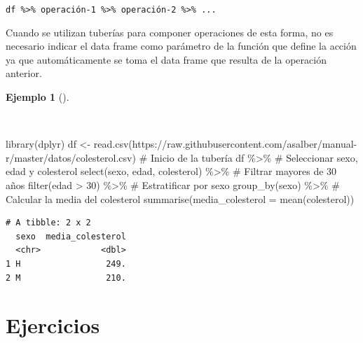 \documentclass[
  spanish,
  a4paper,
]{scrreport}
\newenvironment{Shaded}{\begin{snugshade}}{\end{snugshade}}
\newcommand{\AttributeTok}[1]{\textcolor[rgb]{0.40,0.45,0.13}{#1}}
\newcommand{\CommentTok}[1]{\textcolor[rgb]{0.37,0.37,0.37}{#1}}
\newcommand{\DecValTok}[1]{\textcolor[rgb]{0.68,0.00,0.00}{#1}}
\newcommand{\FunctionTok}[1]{\textcolor[rgb]{0.28,0.35,0.67}{#1}}
\newcommand{\NormalTok}[1]{\textcolor[rgb]{0.00,0.23,0.31}{#1}}
\newcommand{\OtherTok}[1]{\textcolor[rgb]{0.00,0.23,0.31}{#1}}
\newcommand{\SpecialCharTok}[1]{\textcolor[rgb]{0.37,0.37,0.37}{#1}}
\newcommand{\StringTok}[1]{\textcolor[rgb]{0.13,0.47,0.30}{#1}}
\theoremstyle{definition}
\theoremstyle{definition}
\newtheorem{example}{Ejemplo}[chapter]
\theoremstyle{remark}
\begin{document}
\texttt{df\ \%\textgreater{}\%\ operación-1\ \%\textgreater{}\%\ operación-2\ \%\textgreater{}\%\ ...}

Cuando se utilizan tuberías para componer operaciones de esta forma, no
es necesario indicar el data frame como parámetro de la función que
define la acción ya que automáticamente se toma el data frame que
resulta de la operación anterior.

\begin{example}[]\protect\hypertarget{exm-tuberías-1}{}\label{exm-tuberías-1}

~

\begin{Shaded}
\begin{Highlighting}[]
\FunctionTok{library}\NormalTok{(dplyr)}
\NormalTok{df }\OtherTok{\textless{}{-}} \FunctionTok{read.csv}\NormalTok{(}\StringTok{\textquotesingle{}https://raw.githubusercontent.com/asalber/manual{-}r/master/datos/colesterol.csv\textquotesingle{}}\NormalTok{)}
\CommentTok{\# Inicio de la tubería}
\NormalTok{df }\SpecialCharTok{\%\textgreater{}\%} 
    \CommentTok{\# Seleccionar sexo, edad y colesterol}
    \FunctionTok{select}\NormalTok{(sexo, edad, colesterol) }\SpecialCharTok{\%\textgreater{}\%}
    \CommentTok{\# Filtrar mayores de 30 años}
    \FunctionTok{filter}\NormalTok{(edad }\SpecialCharTok{\textgreater{}} \DecValTok{30}\NormalTok{) }\SpecialCharTok{\%\textgreater{}\%}
    \CommentTok{\# Estratificar por sexo}
    \FunctionTok{group\_by}\NormalTok{(sexo) }\SpecialCharTok{\%\textgreater{}\%}
    \CommentTok{\# Calcular la media del colesterol}
    \FunctionTok{summarise}\NormalTok{(}\AttributeTok{media\_colesterol =} \FunctionTok{mean}\NormalTok{(colesterol))}
\end{Highlighting}
\end{Shaded}

\begin{verbatim}
# A tibble: 2 x 2
  sexo  media_colesterol
  <chr>            <dbl>
1 H                 249.
2 M                 210.
\end{verbatim}

\end{example}

\section{Ejercicios}\label{ejercicios-4}
\end{document}
